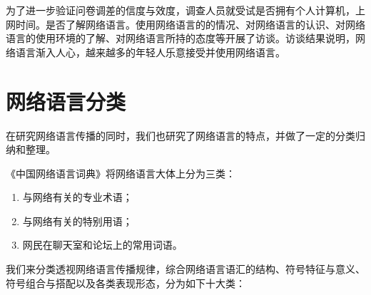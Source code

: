 为了进一步验证问卷调差的信度与效度，调查人员就受试是否拥有个人计算机，上网时间。是否了解网络语言。使用网络语言的的情况、对网络语言的认识、对网络语言的使用环境的了解、对网络语言所持的态度等开展了访谈。访谈结果说明，网络语言渐入人心，越来越多的年轻人乐意接受并使用网络语言。

\section{网络语言分类}

在研究网络语言传播的同时，我们也研究了网络语言的特点，并做了一定的分类归纳和整理。

《中国网络语言词典》\cite{webt}将网络语言大体上分为三类：
\begin{enumerate}
\item 与网络有关的专业术语；
\item 与网络有关的特别用语；
\item 网民在聊天室和论坛上的常用词语。
\end{enumerate}

我们来分类透视网络语言传播规律，综合网络语言语汇的结构、符号特征与意义、符号组合与搭配以及各类表现形态，分为如下十大类：

